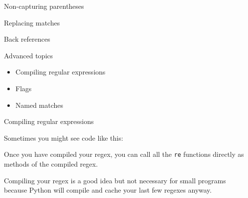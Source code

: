 \documentclass{beamer}
\begin{document}
\begin{frame}{Non-capturing parentheses}

\end{frame}

\begin{frame}{Replacing matches}

\end{frame}

\begin{frame}{Back references}

\end{frame}

\begin{frame}{Advanced topics}

\begin{itemize}
 \item Compiling regular expressions
 \item Flags
 \item Named matches
\end{itemize}

\end{frame}

\begin{frame}{Compiling regular expressions}

Sometimes you might see code like this:



{\small Once you have compiled your regex, you can call all the \lstinline$re$ functions
directly as methods of the compiled regex. }

\bigskip

{\small Compiling your regex is a good idea but not necessary for small
programs because Python will compile and cache your last few regexes anyway.}

\end{frame}


\def\signed #1{{\leavevmode\unskip\nobreak\hfil\penalty50\hskip2em
  \hbox{}\nobreak\hfil #1%
  \parfillskip=0pt \finalhyphendemerits=0 \endgraf}}

\newsavebox\mybox
\newenvironment{aquote}[1]
  {\savebox\mybox{#1}\begin{quote}}
  {\signed{\usebox\mybox}\end{quote}}
  
\end{document}
